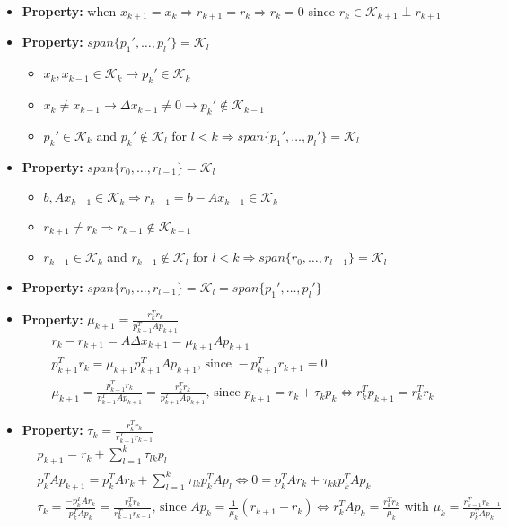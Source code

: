 \documentclass{article}
\begin{document}
\begin{itemize}
    \item \textbf{Property:} when $x_{k+1} = x_k \Rightarrow r_{k+1} = r_k \Rightarrow r_k = 0$ since $r_k \in \mathcal{K}_{k+1} \perp r_{k+1}$
    \item \textbf{Property:} $span\{p_1', \dots, p_l'\} = \mathcal{K}_l$
    \begin{itemize}
        \item $x_k, x_{k-1} \in \mathcal{K}_k \rightarrow p_k' \in \mathcal{K}_k$
        \item $x_k \neq x_{k-1} \rightarrow \Delta x_{k-1} \neq 0 \rightarrow p_k' \notin \mathcal{K}_{k-1}$
        \item $p_k' \in \mathcal{K}_k$ and $p_k' \notin \mathcal{K}_l$ for $l < k \Longrightarrow span\{p_1', \dots, p_l'\} = \mathcal{K}_l$
    \end{itemize}
    \item \textbf{Property:} $span\{r_0, \dots, r_{l-1}\} = \mathcal{K}_l$
    \begin{itemize}
        \item $b, Ax_{k-1} \in \mathcal{K}_k \Longrightarrow r_{k-1} = b-Ax_{k-1} \in \mathcal{K}_k$
        \item $r_{k+1} \neq r_k \Longrightarrow r_{k-1} \notin \mathcal{K}_{k-1}$
        \item $r_{k-1} \in \mathcal{K}_k$ and $r_{k-1} \notin \mathcal{K}_{l}$ for $l < k \Longrightarrow span\{r_0, \dots, r_{l-1}\} = \mathcal{K}_l$
    \end{itemize}
    \item \textbf{Property:} $span\{r_0, \dots, r_{l-1}\} = \mathcal{K}_l = span\{p_1', \dots, p_l'\}$
    \item \textbf{Property:} $\mu_{k+1} = \frac{r_k^Tr_k}{p_{k+1}^TAp_{k+1}}$
    \begin{align*}
        &r_k - r_{k+1} = A\Delta x_{k+1} = \mu_{k+1}Ap_{k+1}\\
        &p_{k+1}^Tr_k = \mu_{k+1}p_{k+1}^TAp_{k+1} \textrm{, since } - p_{k+1}^Tr_{k+1} =0\\
        &\mu_{k+1} = \frac{p_{k+1}^Tr_k}{p_{k+1}^TAp_{k+1}} = \frac{r_k^Tr_k}{p_{k+1}^TAp_{k+1}} \textrm{, since } p_{k+1} = r_k + \tau_kp_k \Longleftrightarrow r_k^Tp_{k+1} = r_k^Tr_k
    \end{align*}
    \item \textbf{Property:} $\tau_k = \frac{r_k^Tr_k}{r_{k-1}^Tr_{k-1}}$
    \begin{align*}
        &p_{k+1} = r_k + \sum_{l=1}^k \tau_{lk}p_l\\
        &p_k^TAp_{k+1} = p_k^TAr_k + \sum_{l=1}^k \tau_{lk}p_k^TAp_l \Longleftrightarrow 0 = p_k^TAr_k + \tau_{kk}p_k^TAp_k\\
        &\tau_k = \frac{-p_k^TAr_k}{p_k^TAp_k} = \frac{r_k^Tr_k}{r_{k-1}^Tr_{k-1}} \textrm{, since } Ap_k = \frac{1}{\mu_k}(r_{k+1} - r_k) \Longleftrightarrow r_k^TAp_k = \frac{r_k^Tr_k}{\mu_k} \textrm{ with } \mu_k = \frac{r_{k-1}^Tr_{k-1}}{p_k^TAp_k}
    \end{align*}
\end{itemize}
\end{document}
